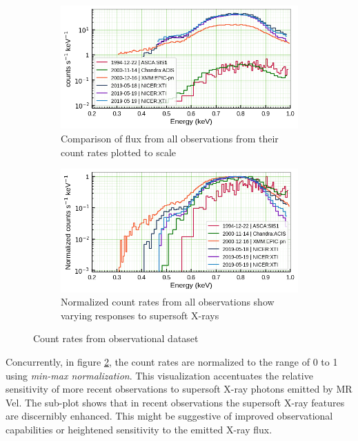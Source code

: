     \begin{figure}[!htb]
        \centering
        \begin{subfigure}[b]{0.45\textwidth}
            \centering
            \includegraphics[width=\textwidth]{figures/ldata/mr-vel-counts_all-obs.png}
            \caption{Comparison of flux from all observations from their count rates plotted to scale}
            \label{fig:all-counts:unnorm}
        \end{subfigure}
        \hfill
        \begin{subfigure}[b]{0.45\textwidth}
            \centering
            \includegraphics[width=\textwidth]{figures/ldata/mr-vel-normcounts_all-obs.png}
            \caption{Normalized count rates from all observations show varying responses to supersoft X-rays}
            \label{fig:all-counts:norm}
        \end{subfigure}
        \caption{Count rates from observational dataset}
        \label{fig:all-counts}
    \end{figure}
    
    Concurrently, in figure \ref{fig:all-counts:norm}, the count rates are normalized to the range of 0 to 1 using \textit{min-max normalization}. This visualization accentuates the relative sensitivity of more recent observations to supersoft X-ray photons emitted by MR Vel. The sub-plot shows that in recent observations the supersoft X-ray features are discernibly enhanced. This might be suggestive of improved observational capabilities or heightened sensitivity to the emitted X-ray flux.
    
